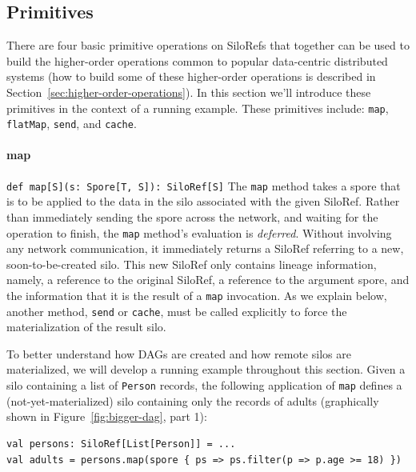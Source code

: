 \documentclass{jfp1}
\begin{document}
\subsection{Primitives}
\label{sec:primitives}

There are four basic primitive operations on SiloRefs that together can be used
to build the higher-order operations common to popular data-centric distributed
systems (how to build some of these higher-order operations is described in
Section~\ref{sec:higher-order-operations}). In this section we'll introduce
these primitives in the context of a running example. These primitives include:
\verb|map|, \verb|flatMap|, \verb|send|, and \verb|cache|.

\paragraph{map}%
%
\texttt{def map[S](s: Spore[T, S]): SiloRef[S]} \newline
%
The \verb|map| method takes a spore that is to be applied to the data in the
silo associated with the given SiloRef. Rather than immediately sending the
spore across the network, and waiting for the operation to finish, the
\verb|map| method's evaluation is \emph{deferred}. Without involving any network
communication, it immediately returns a SiloRef referring to a new,
soon-to-be-created silo. This new SiloRef only contains lineage information,
namely, a reference to the original SiloRef, a reference to the argument spore,
and the information that it is the result of a \verb|map| invocation. As we
explain below, another method, \verb|send| or \verb|cache|, must be called
explicitly to force the materialization of the result silo.

To better understand how DAGs are created and how remote silos are materialized,
we will develop a running example throughout this section. Given a silo
containing a list of \verb|Person| records, the following application of
\verb|map| defines a (not-yet-materialized) silo containing only the records of
adults (graphically shown in Figure~\ref{fig:bigger-dag}, part 1):

\begin{lstlisting}
val persons: SiloRef[List[Person]] = ...
val adults = persons.map(spore { ps => ps.filter(p => p.age >= 18) })
\end{lstlisting}
\end{document}

